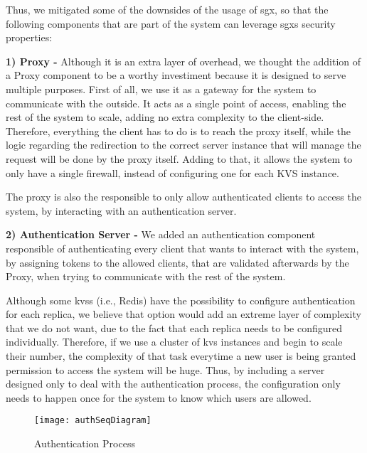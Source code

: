 Thus, we mitigated some of the downsides of the usage of \gls{sgx}, so that the following components that are part of the system can leverage \gls{sgx}s security properties:

\vspace{5mm} 

\textbf{1) Proxy -}
Although it is an extra layer of overhead, we thought the addition of a Proxy component to be a worthy investiment because it is designed to serve multiple purposes. 
First of all, we use it as a gateway for the system to communicate with the outside. It acts as a single point of access, enabling the rest of the system to scale, adding no extra complexity to the client-side. Therefore, everything the client has to do is to reach the proxy itself, while the logic regarding the redirection to the correct server instance that will manage the request will be done by the proxy itself. Adding to that, it allows the system to only have a single firewall, instead of configuring one for each KVS instance.

The proxy is also the responsible to only allow authenticated clients to access the system, by interacting with an authentication server. 

\vspace{5mm} 

\textbf{2) Authentication Server -}
We added an authentication component responsible of authenticating every client that wants to interact with the system, by assigning tokens to the allowed clients, that are validated afterwards by the Proxy, when trying to communicate with the rest of the system.
 
Although some \gls{kvs}s (i.e., Redis) have the possibility to configure authentication for each replica, we believe that option would add an extreme layer of complexity that we do not want, due to the fact that each replica needs to be configured individually. Therefore, if we use a cluster of \gls{kvs} instances and begin to scale their number, the complexity of that task everytime a new user is being granted permission to access the system will be huge. Thus, by including a server designed only to deal with the authentication process, the configuration only needs to happen once for the system to know which users are allowed.

\vspace{3mm}

\begin{figure}[htbp]
	\centering
	{\texttt{[image: authSeqDiagram]}}
	\caption{Authentication Process}
	\label{fig:authProcess}
\end{figure}

